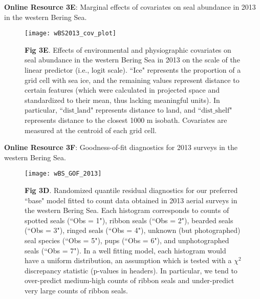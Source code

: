 \documentclass{svjour3}
\begin{document}
\pagebreak

\textbf{Online Resource 3E}: Marginal effects of covariates on seal abundance in 2013 in the western Bering Sea.
\begin{figure}[ht]
\centering
\texttt{[image: wBS2013\_cov\_plot]}
\caption{\textbf{Fig 3E}. Effects of environmental and physiographic covariates on seal abundance in the western Bering Sea in 2013 on the scale of the linear predictor (i.e., logit scale). ``Ice" represents the proportion of a grid cell with sea ice, and the remaining values represent distance to certain features (which were calculated in projected space and standardized to their mean, thus lacking meaningful units).  In particular, ``$\text{dist}\_\text{land}$" represents distance to land, and ``$\text{dist}\_\text{shelf}$" represents distance to the closest 1000 m isobath. Covariates are measured at the centroid of each grid cell.   }
\label{fig:covsWBS2013}
\end{figure}

\pagebreak

\textbf{Online Resource 3F}: Goodness-of-fit diagnostics for 2013 surveys in the western Bering Sea.
\begin{figure}[ht]
\centering
\texttt{[image: wBS\_GOF\_2013]}
\caption{\textbf{Fig 3D}. Randomized quantile residual diagnostics for our preferred ``base" model fitted to count data obtained in 2013 aerial surveys in the western Bering Sea.  Each histogram corresponds to counts of spotted seals (``Obs = 1"), ribbon seals (``Obs = 2"), bearded seals (``Obs = 3"), ringed seals (``Obs = 4"), unknown (but photographed) seal species (``Obs = 5"), pups (``Obs = 6"), and unphotographed seals (``Obs = 7").  In a well fitting model, each histogram would have a uniform distribution, an assumption which is tested with a $\chi^2$ discrepancy statistic (p-values in headers).  In particular, we tend to over-predict medium-high counts of ribbon seals and under-predict very large counts of ribbon seals.}
\label{fig:GOFwBS2013}
\end{figure}
\end{document}
